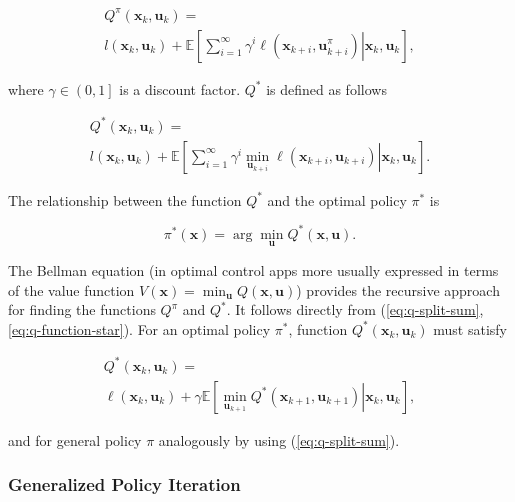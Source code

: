 \documentclass{ifacconf}
\begin{document}
\begin{multline}
Q^{\pi}(\mathbf{x}_{k},\mathbf{u}_{k})=\\
l(\mathbf{x}_{k},\mathbf{u}_{k})+\mathbb{E}\left[\left.\sum_{i=1}^{\infty}\gamma^{i}\ell(\mathbf{x}_{k+i},\mathbf{u}_{k+i}^{\pi})\right|\mathbf{x}_{k},\mathbf{u}_{k}\right],\label{eq:q-split-sum}
\end{multline}

\noindent where $\gamma\in\left(0,1\right]$ is a discount factor.
$Q^{*}$ is defined as follows

\begin{multline}
Q^{*}(\mathbf{x}_{k},\mathbf{u}_{k})=\\
l(\mathbf{x}_{k},\mathbf{u}_{k})+\mathbb{E}\left[\left.\sum_{i=1}^{\infty}\gamma^{i}\min_{\mathbf{u}_{k+i}}\ell(\mathbf{x}_{k+i},\mathbf{u}_{k+i})\right|\mathbf{x}_{k},\mathbf{u}_{k}\right].\label{eq:q-function-star}
\end{multline}

The relationship between the function $Q^{*}$ and the optimal policy
$\pi^{*}$ is

\begin{equation}
\pi^{*}(\mathbf{x})=\arg\min_{\mathbf{u}}Q^{*}(\mathbf{x},\mathbf{u}).\label{eq:q-function-policy}
\end{equation}

The Bellman equation (in optimal control apps more usually expressed in terms of the value function $V(\mathbf{x})=\min_{\mathbf{u}}Q(\mathbf{x},\mathbf{u})$) provides
the recursive approach for finding the functions $Q^{\pi}$ and $Q^{*}$.
It follows directly from (\ref{eq:q-split-sum}, \ref{eq:q-function-star}).
For an optimal policy $\pi^{*}$, function $Q^{*}(\mathbf{x}_{k},\mathbf{u}_{k})$ must
satisfy

\begin{multline}
Q^{*}(\mathbf{x}_{k},\mathbf{u}_{k})=\\
\ell(\mathbf{x}_{k},\mathbf{u}_{k})+\gamma\mathbb{E}\left[\left.\min_{\mathbf{u}_{k+1}}Q^{*}(\mathbf{x}_{k+1},\mathbf{u}_{k+1})\right|\mathbf{x}_{k},\mathbf{u}_{k}\right],\label{eq:q-value-iteration}
\end{multline}

and for general policy $\pi$ analogously by using (\ref{eq:q-split-sum}).

\subsubsection{Generalized Policy Iteration\label{subsec:Policy-Iteration}}
\end{document}
